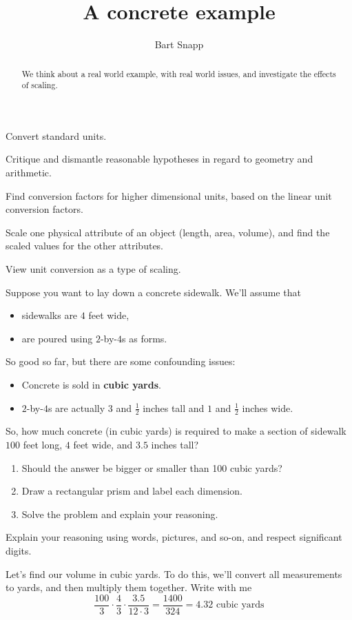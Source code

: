 \documentclass[handout,nooutcomes,noauthor,12pt]{ximera}
\title{A concrete example}
\author{Bart Snapp}
\begin{document}
\begin{abstract}
  We think about a real world example, with real world issues, and
  investigate the effects of scaling.
\end{abstract}
\maketitle


\begin{listOutcomes}
\item Convert standard units.
\item Critique and dismantle reasonable hypotheses in regard to
  geometry and arithmetic.
\item Find conversion factors for higher dimensional units, based on
  the linear unit conversion factors.
\item Scale one physical attribute of an object (length, area,
  volume), and find the scaled values for the other attributes.
\item View unit conversion as a type of scaling.
\end{listOutcomes}



\mynewpage



\begin{question}
  Suppose you want to lay down a concrete sidewalk. We'll assume that
  \begin{itemize}
  \item sidewalks are $4$ feet wide,
  \item are poured using $2$-by-$4$s as forms.
  \end{itemize}
  So good so far, but there are some confounding issues:
  \begin{itemize}
  \item Concrete is sold in \textbf{cubic yards}.
  \item $2$-by-$4$s are actually $3$ and $\frac{1}{2}$ inches tall and
    $1$ and $\frac{1}{2}$ inches wide.
  \end{itemize}
  So, how much concrete (in cubic yards) is required to make a section
  of sidewalk $100$ feet long, $4$ feet wide, and $3.5$ inches tall? 
\begin{enumerate}
\item Should the answer be bigger or smaller than 100 cubic yards?
\item Draw a rectangular prism and label each dimension.
\item Solve the problem and explain your reasoning.
\end{enumerate}
  
  
  
  Explain your reasoning using words, pictures, and so-on, and respect significant digits. 
  \begin{freeResponse}
    Let's find our volume in cubic yards. To do this, we'll convert
    all measurements to yards, and then multiply them together. Write with me
    \[
    \frac{100}{3} \cdot \frac{4}{3}\cdot \frac{3.5}{12\cdot 3} = \frac{1400}{324} = 4.32 \text{ cubic yards}
    \] 
  \end{freeResponse}
\end{question}
\mynewpage
\end{document}
